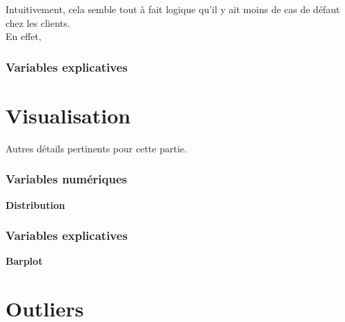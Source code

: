 \documentclass[a4paper,12pt]{report}
\begin{document}
Intuitivement, cela semble tout à fait logique qu'il y ait moins de cas de défaut chez les clients.\\
En effet,

\subsubsection{Variables explicatives}

\section{Visualisation}
Autres détails pertinents pour cette partie.

\subsubsection{Variables numériques}

\textbf{Distribution}

\subsubsection{Variables explicatives}

\textbf{Barplot}

\section{Outliers}
\end{document}
